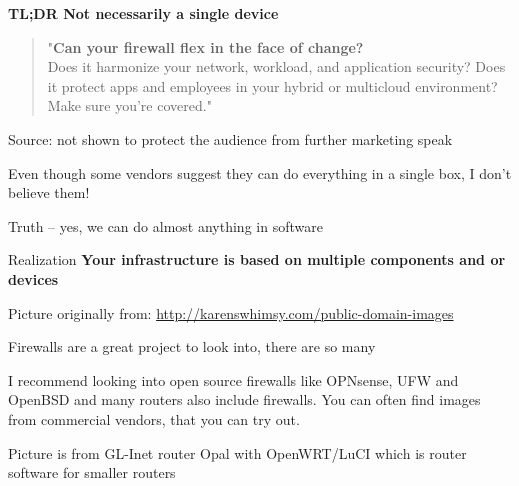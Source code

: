 \documentclass[Screen16to9,17pt]{foils}
\begin{document}
{\bf TL;DR Not necessarily a single device}






\begin{quote}
"{\bf Can your firewall flex in the face of change?}\\
Does it harmonize your network, workload, and application security? Does it protect apps and employees in your hybrid or multicloud environment? Make sure you're covered."
\end{quote}
Source: not shown to protect the audience from further marketing speak






\begin{list2}
\item Even though some vendors suggest they can do everything in a single box, I don't believe them!
\item Truth -- yes, we can do almost anything in software
\item Realization {\bf Your infrastructure is based on multiple components and or devices}
\end{list2}



\centerline{Picture originally from: \url{http://karenswhimsy.com/public-domain-images}}



\begin{list2}
\item Firewalls are a great project to look into, there are so many \smiley
\item I recommend looking into open source firewalls like OPNsense, UFW and OpenBSD and many routers also include firewalls.
 You can often find images from commercial vendors, that you can try out.
\item Picture is from GL-Inet router Opal with OpenWRT/LuCI which is router software for smaller routers
\end{list2}
\end{document}
